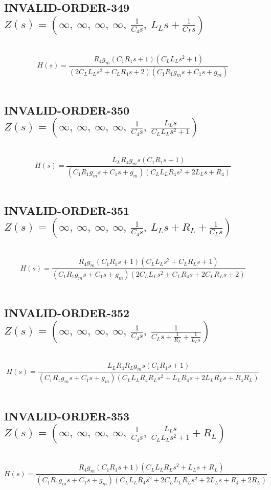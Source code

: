 \documentclass{article}
\begin{document}
\subsection{INVALID-ORDER-349 $Z(s) = \left( \infty, \  \infty, \  \infty, \  \infty, \  \frac{1}{C_{4} s}, \  L_{L} s + \frac{1}{C_{L} s}\right)$ } \ 
\textbf{\[H(s) = \frac{R_{4} g_{m} \left(C_{1} R_{1} s + 1\right) \left(C_{L} L_{L} s^{2} + 1\right)}{\left(2 C_{L} L_{L} s^{2} + C_{L} R_{4} s + 2\right) \left(C_{1} R_{1} g_{m} s + C_{1} s + g_{m}\right)}\] } \ 
\subsection{INVALID-ORDER-350 $Z(s) = \left( \infty, \  \infty, \  \infty, \  \infty, \  \frac{1}{C_{4} s}, \  \frac{L_{L} s}{C_{L} L_{L} s^{2} + 1}\right)$ } \ 
\textbf{\[H(s) = \frac{L_{L} R_{4} g_{m} s \left(C_{1} R_{1} s + 1\right)}{\left(C_{1} R_{1} g_{m} s + C_{1} s + g_{m}\right) \left(C_{L} L_{L} R_{4} s^{2} + 2 L_{L} s + R_{4}\right)}\] } \ 
\subsection{INVALID-ORDER-351 $Z(s) = \left( \infty, \  \infty, \  \infty, \  \infty, \  \frac{1}{C_{4} s}, \  L_{L} s + R_{L} + \frac{1}{C_{L} s}\right)$ } \ 
\textbf{\[H(s) = \frac{R_{4} g_{m} \left(C_{1} R_{1} s + 1\right) \left(C_{L} L_{L} s^{2} + C_{L} R_{L} s + 1\right)}{\left(C_{1} R_{1} g_{m} s + C_{1} s + g_{m}\right) \left(2 C_{L} L_{L} s^{2} + C_{L} R_{4} s + 2 C_{L} R_{L} s + 2\right)}\] } \ 
\subsection{INVALID-ORDER-352 $Z(s) = \left( \infty, \  \infty, \  \infty, \  \infty, \  \frac{1}{C_{4} s}, \  \frac{1}{C_{L} s + \frac{1}{R_{L}} + \frac{1}{L_{L} s}}\right)$ } \ 
\textbf{\[H(s) = \frac{L_{L} R_{4} R_{L} g_{m} s \left(C_{1} R_{1} s + 1\right)}{\left(C_{1} R_{1} g_{m} s + C_{1} s + g_{m}\right) \left(C_{L} L_{L} R_{4} R_{L} s^{2} + L_{L} R_{4} s + 2 L_{L} R_{L} s + R_{4} R_{L}\right)}\] } \ 
\subsection{INVALID-ORDER-353 $Z(s) = \left( \infty, \  \infty, \  \infty, \  \infty, \  \frac{1}{C_{4} s}, \  \frac{L_{L} s}{C_{L} L_{L} s^{2} + 1} + R_{L}\right)$ } \ 
\textbf{\[H(s) = \frac{R_{4} g_{m} \left(C_{1} R_{1} s + 1\right) \left(C_{L} L_{L} R_{L} s^{2} + L_{L} s + R_{L}\right)}{\left(C_{1} R_{1} g_{m} s + C_{1} s + g_{m}\right) \left(C_{L} L_{L} R_{4} s^{2} + 2 C_{L} L_{L} R_{L} s^{2} + 2 L_{L} s + R_{4} + 2 R_{L}\right)}\] } \ 
\end{document}
